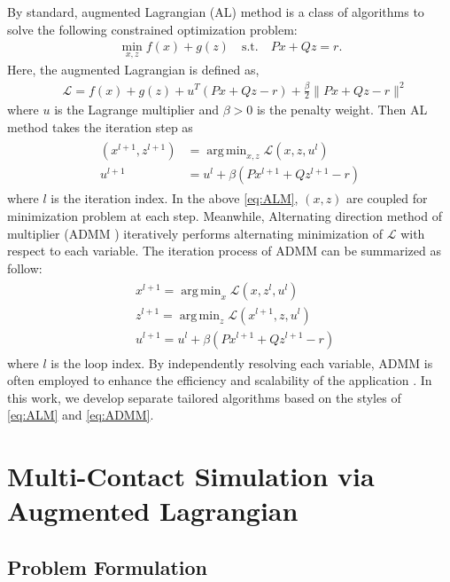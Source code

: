\documentclass[lettersize,journal]{IEEEtran}
\DeclareMathOperator*{\argmin}{arg\,min}
\begin{document}
By standard, augmented Lagrangian (AL) method is a class of algorithms to solve the following constrained optimization problem:
\begin{align*}
    \min_{x,z} f(x) + g(z) \quad \text{s.t.} \quad Px+Qz = r.
\end{align*}
Here, the augmented Lagrangian is defined as,
\begin{align*} 
    &\mathcal{L} = f(x) + g(z) + u^T(Px+Qz-r) + \frac{\beta}{2} \| Px+Qz - r\|^2
\end{align*}
where $u$ is the Lagrange multiplier and $\beta > 0$ is the penalty weight.
Then AL method takes the iteration step as
\begin{align} \label{eq:ALM}
\begin{split}
    (x^{l+1},z^{l+1}) &= \argmin_{x,z} \mathcal{L}(x,z,u^l) \\
    u^{l+1} &= u^l + \beta(Px^{l+1}+Qz^{l+1}-r)
\end{split}
\end{align}
where $l$ is the iteration index. 
In the above \eqref{eq:ALM}, $(x,z)$ are coupled for minimization problem at each step. 
Meanwhile, Alternating direction method of multiplier (ADMM \cite{boyd2011distributed}) iteratively performs alternating minimization of $\mathcal{L}$ with respect to each variable. The iteration process of ADMM can be summarized as follow:
\begin{align} \label{eq:ADMM}
\begin{split}
    &x^{l+1} = \argmin_{x} \mathcal{L}(x,z^l,u^l)  \\
    &z^{l+1} = \argmin_{z} \mathcal{L}(x^{l+1},z,u^l)  \\
    &u^{l+1} = u^l + \beta(Px^{l+1}+Qz^{l+1}-r)
\end{split}
\end{align}
where $l$ is the loop index. 
By independently resolving each variable, ADMM is often employed to enhance the efficiency and scalability of the application \cite{boyd2011distributed, wang2019admm}. 
In this work, we develop separate tailored algorithms based on the styles of \eqref{eq:ALM} and \eqref{eq:ADMM}.


\section{Multi-Contact Simulation via Augmented Lagrangian} \label{sec:multicontactAL}

\subsection{Problem Formulation}
\end{document}
